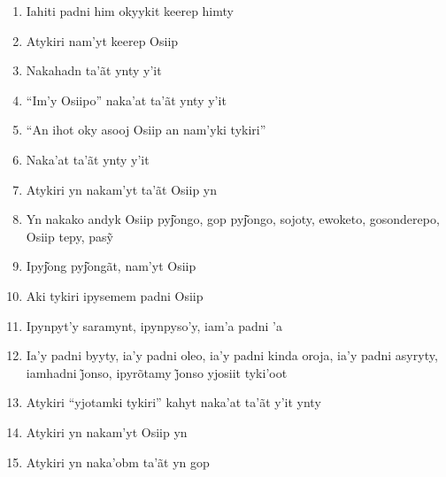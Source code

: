\begin{enumerate}
 \item Iahiti padni him okyykit keerep himty

 \item Atykiri nam'yt keerep Osiip

 \begin{center}\end{center}

 \item Nakahadn ta'ãt ynty y'it

 \item ``Im'y Osiipo'' naka'at ta'ãt ynty y'it

 \begin{center}\end{center}

 \item ``An ihot oky asooj Osiip an nam'yki tykiri''

 \item Naka'at ta'ãt ynty y'it

 \item Atykiri yn nakam'yt ta'ãt Osiip yn

 \item Yn nakako andyk Osiip pyj͂ongo, gop pyj͂ongo, sojoty, ewoketo, gosonderepo, Osiip tepy, pasỹ

 \item Ipyj͂ong pyj͂ongãt, nam'yt Osiip

 \item Aki tykiri ipysemem padni Osiip

 \begin{center}\end{center}

 \item Ipynpyt'y saramynt, ipynpyso'y, iam'a padni 'a

 \item Ia’y padni byyty, ia’y padni oleo, ia’y padni kinda oroja, ia’y padni asyryty, iamhadni j̃onso, ipyrõtamy j̃onso yjosiit tyki’oot

 \begin{center}\end{center}

 \item Atykiri ``yjotamki tykiri'' kahyt naka'at ta'ãt y'it ynty

 \item Atykiri yn nakam'yt Osiip yn

 \item Atykiri yn naka'obm ta'ãt yn gop


\end{enumerate}
